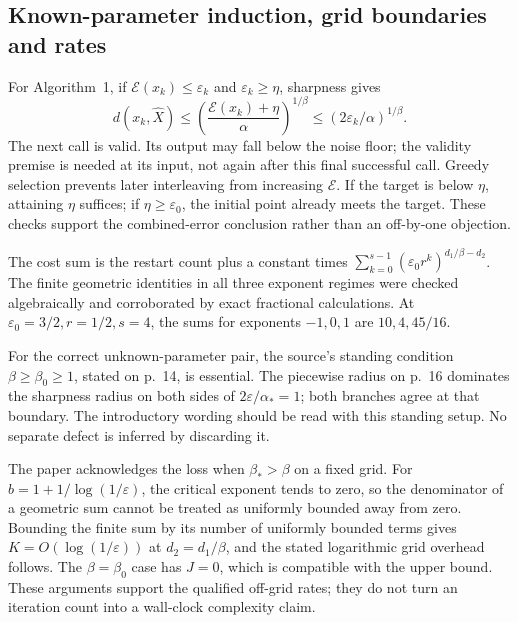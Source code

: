 \documentclass[10pt]{article}
\begin{document}
\subsection*{Known-parameter induction, grid boundaries and rates}
For Algorithm 1, if \(\mathcal E(x_k)\le\varepsilon_k\) and \(\varepsilon_k\ge\eta\), sharpness gives \[d(x_k,\widehat X)\le
 \left(\frac{\mathcal E(x_k)+\eta}{\alpha}\right)^{1/\beta}
 \le(2\varepsilon_k/\alpha)^{1/\beta}.\] The next call is valid. Its output may fall below the noise floor; the validity premise is needed at its input, not again after this final successful call. Greedy selection prevents later interleaving from increasing \(\mathcal E\). If the target is below \(\eta\), attaining \(\eta\) suffices; if \(\eta\ge\varepsilon_0\), the initial point already meets the target. These checks support the combined-error conclusion rather than an off-by-one objection.\par
The cost sum is the restart count plus a constant times \(\sum_{k=0}^{s-1}(\varepsilon_0r^k)^{d_1/\beta-d_2}\). The finite geometric identities in all three exponent regimes were checked algebraically and corroborated by exact fractional calculations. At \(\varepsilon_0=3/2,r=1/2,s=4\), the sums for exponents \(-1,0,1\) are \(10,4,45/16\).\par
For the correct unknown-parameter pair, the source’s standing condition \(\beta\ge\beta_0\ge1\), stated on p. 14, is essential. The piecewise radius on p. 16 dominates the sharpness radius on both sides of \(2\varepsilon/\alpha_*=1\); both branches agree at that boundary. The introductory wording should be read with this standing setup. No separate defect is inferred by discarding it.\par
The paper acknowledges the loss when \(\beta_*>\beta\) on a fixed grid. For \(b=1+1/\log(1/\varepsilon)\), the critical exponent tends to zero, so the denominator of a geometric sum cannot be treated as uniformly bounded away from zero. Bounding the finite sum by its number of uniformly bounded terms gives \(K=O(\log(1/\varepsilon))\) at \(d_2=d_1/\beta\), and the stated logarithmic grid overhead follows. The \(\beta=\beta_0\) case has \(J=0\), which is compatible with the upper bound. These arguments support the qualified off-grid rates; they do not turn an iteration count into a wall-clock complexity claim.\par
\end{document}
